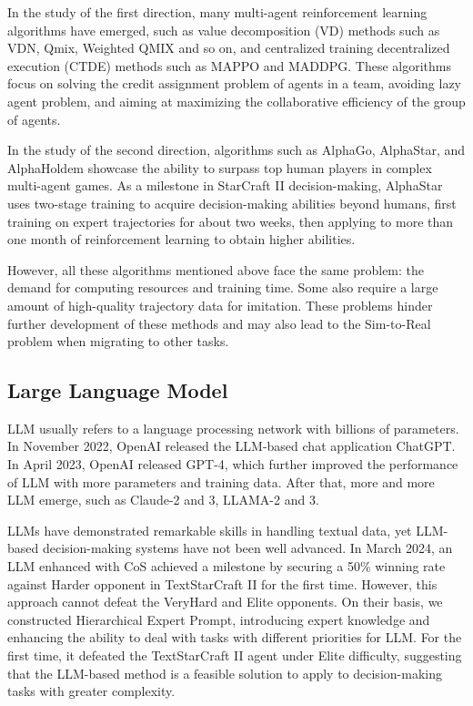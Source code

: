 In the study of the first direction, many multi-agent reinforcement learning algorithms have emerged, such as value decomposition (VD) methods such as VDN\cite{VDN}, Qmix\cite{QMIX}, Weighted QMIX\cite{WQMIX} and so on, and centralized training decentralized execution (CTDE) methods such as MAPPO\cite{MAPPO} and MADDPG\cite{MADDPG}. These algorithms focus on solving the credit assignment problem of agents in a team, avoiding lazy agent problem, and aiming at maximizing the collaborative efficiency of the group of agents.

In the study of the second direction, algorithms such as AlphaGo\cite{AlphaGo}, AlphaStar, and AlphaHoldem\cite{Alphaholdem} showcase the ability to surpass top human players in complex multi-agent games. As a milestone in StarCraft II decision-making, AlphaStar uses two-stage training to acquire decision-making abilities beyond humans, first training on expert trajectories for about two weeks, then applying to more than one month of reinforcement learning to obtain higher abilities. 

However, all these algorithms mentioned above face the same problem: the demand for computing resources and training time. Some also require a large amount of high-quality trajectory data for imitation. These problems hinder further development of these methods and may also lead to the Sim-to-Real problem when migrating to other tasks.

\subsection{Large Language Model}
LLM usually refers to a language processing network with billions of parameters. In November 2022, OpenAI released the LLM-based chat application ChatGPT. In April 2023, OpenAI released GPT-4, which further improved the performance of LLM with more parameters and training data. After that, more and more LLM emerge, such as Claude-2\cite{Claude-2} and 3\cite{Claude-3}, LLAMA-2\cite{LLAMA-2} and 3\cite{LLAMA-3}.

LLMs have demonstrated remarkable skills in handling textual data, yet LLM-based decision-making systems have not been well advanced. In March 2024, an LLM enhanced with CoS achieved a milestone by securing a 50\% winning rate against Harder opponent in TextStarCraft II for the first time. However, this approach cannot defeat the VeryHard and Elite opponents. On their basis, we constructed Hierarchical Expert Prompt, introducing expert knowledge and enhancing the ability to deal with tasks with different priorities for LLM. For the first time, it defeated the TextStarCraft II agent under Elite difficulty, suggesting that the LLM-based method is a feasible solution to apply to decision-making tasks with greater complexity.
%
%
%
%
%